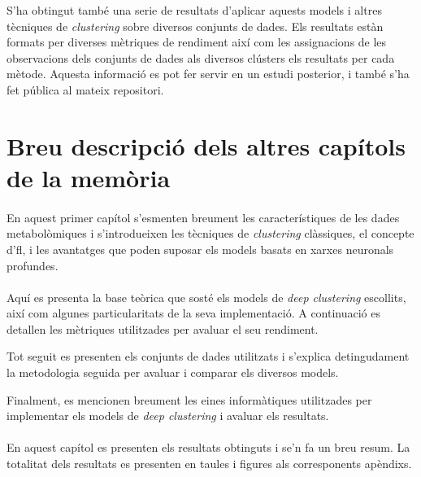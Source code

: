 \documentclass[CAT,BIB]{TFUOC}%
\begin{document}
        S'ha obtingut també una serie de resultats
        d'aplicar aquests models i altres tècniques de \textit{clustering}
        sobre diversos conjunts de dades.
        Els resultats estàn formats per diverses mètriques de rendiment
        així com les assignacions de les observacions dels conjunts de dades
        als diversos clústers els resultats per cada mètode.
        Aquesta informació es pot fer servir en un estudi posterior,
        i també s'ha fet pública al mateix repositori.

    \section{Breu descripció dels altres capítols de la memòria}

    \paragraph{ }
        En aquest primer capítol
        s'esmenten breument les característiques de les dades metabolòmiques
        i s'introdueixen les tècniques de \textit{clustering} clàssiques,
        el concepte d'\gls{fl},
        i les avantatges que poden suposar els models basats en xarxes neuronals profundes.

    \paragraph{ }
        Aquí es presenta la base teòrica que sosté
        els models de \textit{deep clustering} escollits,
        així com algunes particularitats de la seva implementació.
        A continuació es detallen les mètriques
        utilitzades per avaluar el seu rendiment.

        Tot seguit
        es presenten els conjunts de dades utilitzats
        i s'explica detingudament la metodologia seguida
        per avaluar i comparar els diversos models.

        Finalment,
        es mencionen breument les eines informàtiques utilitzades
        per implementar els models de \textit{deep clustering}
        i avaluar els resultats.

    \paragraph{ }
        En aquest capítol
        es presenten els resultats obtinguts
        i se'n fa un breu resum.
        La totalitat dels resultats
        es presenten en taules i figures als corresponents apèndixs.
\end{document}
